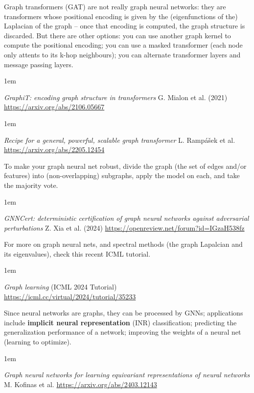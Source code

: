 \documentclass[a5paper]{article}
\let\d\textbf
\newenvironment{reference}{%
  \medskip\goodbreak
  \parskip 0pt
  \raggedright
  \leftskip 1em
  \obeylines
}{\par\medskip\goodbreak}
\begin{document}
Graph transformers (GAT) are not really graph neural networks:
they are transformers whose positional encoding is given by the (eigenfunctions of the) Laplacian of the graph --
once that encoding is computed, the graph structure is discarded. 
But there are other options: 
you can use another graph kernel to compute the positional encoding; 
you can use a masked transformer (each node only attents to its k-hop neighbours);
you can alternate transformer layers and message passing layers.

\begin{reference}
  \emph{GraphiT: encoding graph structure in transformers}
  G. Mialon et al. (2021)
  \url{https://arxiv.org/abs/2106.05667}
\end{reference}

\begin{reference}
  \emph{Recipe for a general, powerful, scalable graph transformer}
  L. Rampášek et al.
  \url{https://arxiv.org/abs/2205.12454}
\end{reference}

To make your graph neural net robust,
divide the graph (the set of edges and/or features) into (non-overlapping) subgraphs,
apply the model on each, and take the majority vote. 

\begin{reference}
  \emph{GNNCert: deterministic certification of graph neural networks against adversarial perturbations}
  Z. Xia et al. (2024)
  \url{https://openreview.net/forum?id=IGzaH538fz}
\end{reference}

For more on graph neural nets, and spectral methods (the graph Lapalcian and its eigenvalues),
check this recent ICML tutorial.

\begin{reference}
  \emph{Graph learning}
  (ICML 2024 Tutorial)
  \url{https://icml.cc/virtual/2024/tutorial/35233}
\end{reference}

Since neural networks are graphs, they can be processed by GNNs;
applications include
\d{implicit neural representation} (INR) classification;
predicting the generalization performance of a network; 
improving the weights of a neural net (learning to optimize).

\begin{reference}
  \emph{Graph neural networks for learning equivariant representations of neural networks}
  M. Kofinas et al.
  \url{https://arxiv.org/abs/2403.12143}
\end{reference}
\end{document}
